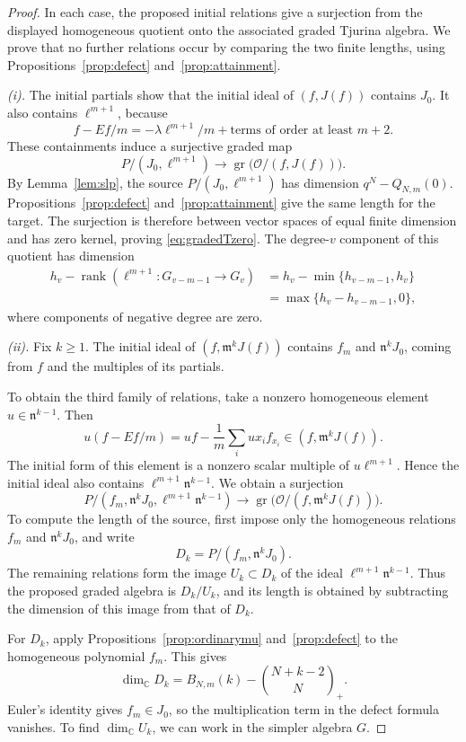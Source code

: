 \documentclass[12pt,reqno]{amsart}
\newcommand{\C}{\mathbb C}
\newcommand{\mm}{\mathfrak m}
\newcommand{\gr}{\operatorname{gr}}
\newcommand{\rank}{\operatorname{rank}}
\newcommand{\tbin}[2]{\binom{#1}{#2}_{\!+}}
\newcommand{\OO}{\mathcal O}
\theoremstyle{definition}
\begin{document}
\begin{proof}
In each case, the proposed initial relations give a surjection from
the displayed homogeneous quotient onto the associated graded Tjurina
algebra. We prove that no further relations occur by comparing the two
finite lengths, using Propositions~\ref{prop:defect}
and~\ref{prop:attainment}.


\emph{(i).}
The initial partials show that the initial ideal of $(f,J(f))$
contains $J_0$. It also contains $\ell^{m+1}$, because
\[
 f-Ef/m=-\lambda\ell^{m+1}/m+
                  \text{terms of order at least }m+2.
\]
These containments induce a surjective graded map
\[
 P/(J_0,\ell^{m+1})\longrightarrow\gr\bigl(\OO/(f,J(f))\bigr).
\]
By Lemma~\ref{lem:slp}, the source $P/(J_0,\ell^{m+1})$ has
dimension $q^N-Q_{N,m}(0)$. Propositions~\ref{prop:defect}
and~\ref{prop:attainment} give the same length for the target.
The surjection is therefore between vector spaces of equal finite
dimension and has zero kernel, proving \eqref{eq:gradedTzero}.
The degree-$v$ component of this quotient has dimension
\begin{align*}
 h_v-\rank(\ell^{m+1}:G_{v-m-1}\longrightarrow G_v)
 & =h_v-\min\{h_{v-m-1},h_v\} \\
 & =\max\{h_v-h_{v-m-1},0\},
\end{align*}
where components of negative degree are zero.

\emph{(ii).}
Fix $k\geq1$. The initial ideal of $(f,\mm^kJ(f))$ contains
$f_m$ and $\mathfrak n^kJ_0$, coming from $f$ and the multiples
of its partials.

 To obtain the third family of relations, take a nonzero
homogeneous element $u\in\mathfrak n^{k-1}$. Then
\[
 u(f-Ef/m)=uf-\frac1m\sum_i ux_i f_{x_i}
                         \in(f,\mm^kJ(f)).
\]
The initial form of this element is a nonzero scalar multiple of
$u\ell^{m+1}$. Hence the initial ideal also contains
$\ell^{m+1}\mathfrak n^{k-1}$. We obtain a surjection
\[
 P/(f_m,\mathfrak n^kJ_0,\ell^{m+1}\mathfrak n^{k-1})
 \longrightarrow\gr\bigl(\OO/(f,\mm^kJ(f))\bigr).
\]
To compute the length of the source, first impose only the
homogeneous relations $f_m$ and $\mathfrak n^kJ_0$, and write
\[
 D_k=P/(f_m,\mathfrak n^kJ_0).
\]
The remaining relations form the image $U_k\subset D_k$ of the
ideal $\ell^{m+1}\mathfrak n^{k-1}$. Thus the proposed graded algebra
is $D_k/U_k$, and its length is obtained by subtracting the dimension
of this image from that of $D_k$.

For $D_k$, apply
Propositions~\ref{prop:ordinarymu} and~\ref{prop:defect}
to the homogeneous polynomial $f_m$. This gives
\[
 \dim_\C D_k =B_{N,m}(k)-\tbin{N+k-2}{N}.
\]
Euler's identity gives $f_m\in J_0$, so the multiplication term
in the defect formula vanishes.
To find $\dim_\C U_k$, we can work in the simpler algebra $G$.


\end{proof}
\end{document}
